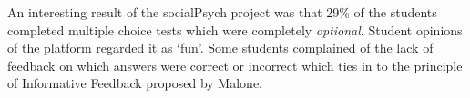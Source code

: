 An interesting result of the socialPsych project was that 29\% of the students
completed multiple choice tests which were completely \textit{optional}\cite[p. 416]{landers_casual_2011}. Student
opinions of the platform regarded it as `fun'\cite[p. 417]{landers_casual_2011}. Some students complained of the
lack of feedback on which answers were correct or incorrect which ties in to
the principle of Informative Feedback proposed by Malone\cite{malone_what_1980}. 

